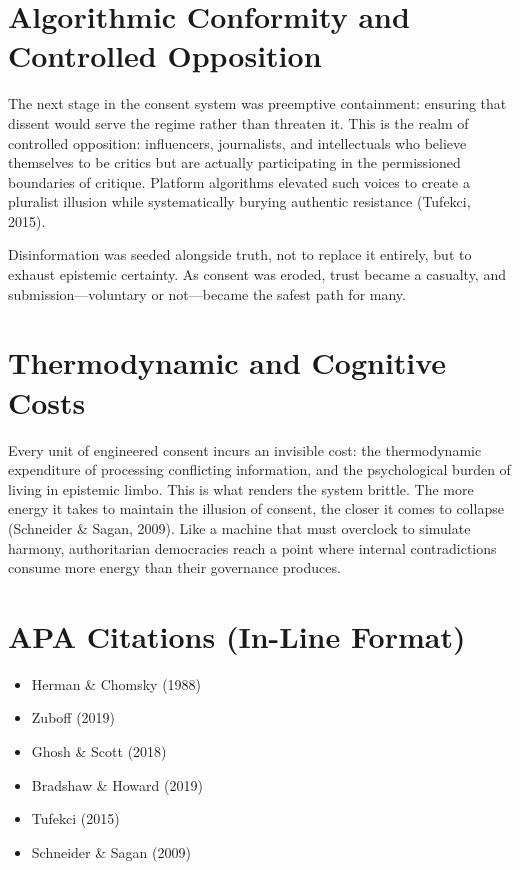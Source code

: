 \section*{Algorithmic Conformity and Controlled Opposition}

The next stage in the consent system was preemptive containment:
ensuring that dissent would serve the regime rather than threaten it.
This is the realm of controlled opposition: influencers, journalists,
and intellectuals who believe themselves to be critics but are actually
participating in the permissioned boundaries of critique. Platform
algorithms elevated such voices to create a pluralist illusion while
systematically burying authentic resistance (Tufekci, 2015).

Disinformation was seeded alongside truth, not to replace it entirely,
but to exhaust epistemic certainty. As consent was eroded, trust became
a casualty, and submission---voluntary or not---became the safest path
for many.

\section*{Thermodynamic and Cognitive Costs}

Every unit of engineered consent incurs an invisible cost: the
thermodynamic expenditure of processing conflicting information, and the
psychological burden of living in epistemic limbo. This is what renders
the system brittle. The more energy it takes to maintain the illusion of
consent, the closer it comes to collapse (Schneider \& Sagan, 2009).
Like a machine that must overclock to simulate harmony, authoritarian
democracies reach a point where internal contradictions consume more
energy than their governance produces.

\section*{APA Citations (In-Line Format)}

\begin{itemize}
\tightlist
\item
  Herman \& Chomsky (1988)
\item
  Zuboff (2019)
\item
  Ghosh \& Scott (2018)
\item
  Bradshaw \& Howard (2019)
\item
  Tufekci (2015)
\item
  Schneider \& Sagan (2009)
\end{itemize}

